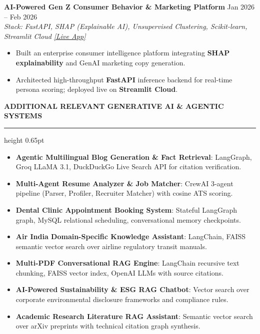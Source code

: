 \documentclass[10pt]{article}
\newcommand{\resumesection}[1]{%
  \vspace{4.5pt}%
  {\large \textbf{\uppercase{#1}}}%
  \vspace{1.5pt}%
  \hrule height 0.65pt%
  \vspace{3pt}%
}
\begin{document}
\textbf{AI-Powered Gen Z Consumer Behavior \& Marketing Platform} \hfill Jan 2026 -- Feb 2026\\
\textit{Stack: FastAPI, SHAP (Explainable AI), Unsupervised Clustering, Scikit-learn, Streamlit Cloud} \hfill \href{https://github.com/Ankitiitk369/AI-Powered-Gen-Z-Consumer-Behavior-Marketing-Intelligence-Platform}{\textit{[Live App]}}
\begin{itemize}[noitemsep, topsep=1pt, partopsep=0pt, parsep=0.5pt]
    \item Built an enterprise consumer intelligence platform integrating \textbf{SHAP explainability} and GenAI marketing copy generation.
    \item Architected high-throughput \textbf{FastAPI} inference backend for real-time persona scoring; deployed live on \textbf{Streamlit Cloud}.
\end{itemize}

\resumesection{Additional Relevant Generative AI \& Agentic Systems}

\begin{itemize}[noitemsep, topsep=1pt, partopsep=0pt, parsep=0.5pt]
    \item \textbf{Agentic Multilingual Blog Generation \& Fact Retrieval}: LangGraph, Groq LLaMA 3.1, DuckDuckGo Live Search API for citation verification.
    \item \textbf{Multi-Agent Resume Analyzer \& Job Matcher}: CrewAI 3-agent pipeline (Parser, Profiler, Recruiter Matcher) with cosine ATS scoring.
    \item \textbf{Dental Clinic Appointment Booking System}: Stateful LangGraph graph, MySQL relational scheduling, conversational memory checkpoints.
    \item \textbf{Air India Domain-Specific Knowledge Assistant}: LangChain, FAISS semantic vector search over airline regulatory transit manuals.
    \item \textbf{Multi-PDF Conversational RAG Engine}: LangChain recursive text chunking, FAISS vector index, OpenAI LLMs with source citations.
    \item \textbf{AI-Powered Sustainability \& ESG RAG Chatbot}: Vector search over corporate environmental disclosure frameworks and compliance rules.
    \item \textbf{Academic Research Literature RAG Assistant}: Semantic vector search over arXiv preprints with technical citation graph synthesis.
\end{itemize}
\end{document}
